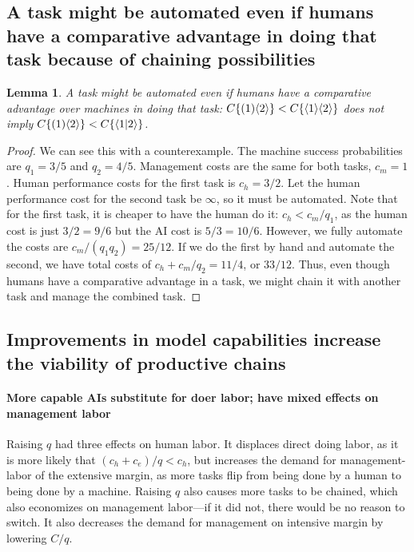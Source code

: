 \documentclass{article}
\newtheorem{lemma}[theorem]{Lemma}
\begin{document}
\subsection{A task might be automated even if humans have a comparative advantage in doing that task because of chaining possibilities}
\begin{lemma}
A task might be automated even if humans have a comparative advantage over machines in doing that task:
$C\{( 1 )\langle 2 \rangle\} < C\{\langle 1 \rangle\langle 2 \rangle\}$ does not imply $C\{( 1 )\langle 2 \rangle\} < C\{\langle 1|2 \rangle\}$.
\end{lemma}
\begin{proof}
We can see this with a counterexample.
The machine success probabilities are $q_1 = 3/5$ and $q_2 = 4/5$.
Management costs are the same for both tasks, $c_m = 1$.
Human performance costs for the first task is $c_h = 3/2$.
Let the human performance cost for the second task be $\infty$, so it must be automated. 
Note that for the first task, it is cheaper to have the human do it: 
$c_h < c_m / q_1$, as the human cost is just $3/2 = 9/6$ but the AI cost is $5/3 = 10/6$.
However, we fully automate the costs are 
$c_m / (q_1 q_2) = 25/12$. 
If we do the first by hand and automate the second, we have total costs of $c_h + c_m / q_2 = 11/4$, or $33/12$.
Thus, even though humans have a comparative advantage in a task, we might chain it with another task and manage the combined task.
\end{proof}

\subsection{Improvements in model capabilities increase the viability of productive chains}

\paragraph{More capable AIs substitute for doer labor; have mixed effects on management labor}
Raising $q$ had three effects on human labor. 
It displaces direct doing labor, as it is more likely that $(c_h + c_e)/q < c_h$, but increases the demand for management-labor of the extensive margin, as more tasks flip from being done by a human to being done by a machine.
Raising $q$ also causes more tasks to be chained, which also economizes on management labor---if it did not, there would be no reason to switch.
It also decreases the demand for management on intensive margin by lowering $C/q$.
\end{document}
